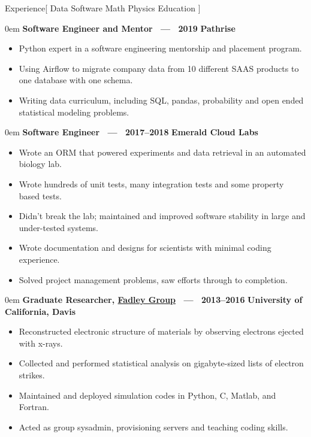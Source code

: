 \documentclass[11pt,a4paper]{article}
\newenvironment{headedsection}[2]{
    \begin{addmargin}[0.5em]{0em}
    {\large\bfseries #1} \hfill {\bfseries #2}%
    \begin{itemize}
        [label={}, topsep=0pt, itemsep=1.5pt, parsep=0pt, leftmargin=1.5em]
}{
    \end{itemize}
    \end{addmargin}
    \medskip
}
\begin{document}
\sloppy  %


\vspace{1em}

\begin{mysection}{Experience}[
    Data 
    \textbullet{} Software
    \textbullet{} Math
    \textbullet{} Physics
    \textbullet{} Education
]

    \begin{headedsection}{Software Engineer and Mentor \ --- \ 2019}{Pathrise}
        \item Python expert in a software engineering mentorship and placement program.
        \item Using Airflow to migrate company data from 10 different SAAS products to one database with one schema.
        \item Writing data curriculum, including SQL, pandas, probability and open ended statistical modeling problems.
    \end{headedsection}

    \begin{headedsection}
        {Software Engineer \ --- \ 2017--2018}{Emerald Cloud Labs}

        \item Wrote an ORM that powered experiments and data retrieval in an automated biology lab.
        \item Wrote hundreds of unit tests, many integration tests and some property based tests.
        \item Didn't break the lab; maintained and improved software stability in large and under-tested systems.
        \item Wrote documentation and designs for scientists with minimal coding experience.
        \item Solved project management problems, saw efforts through to completion.
    \end{headedsection}

    \begin{headedsection}
          {Graduate Researcher, \href{http://www.physics.ucdavis.edu/fadleygroup/}{Fadley Group}
             \ --- \ 2013--2016}
          {University of California, Davis}

        \item Reconstructed electronic structure of materials by observing electrons ejected with x-rays.
        \item Collected and performed statistical analysis on gigabyte-sized lists of electron strikes.
        \item Maintained and deployed simulation codes in Python, C, Matlab, and Fortran.
        \item Acted as group sysadmin, provisioning servers and teaching coding skills.
    \end{headedsection}


\end{mysection}
\end{document}
